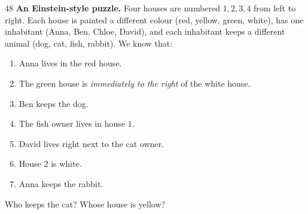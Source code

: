 \begin{probbox}{48}{}
\textbf{An Einstein-style puzzle.} Four houses are numbered $1, 2, 3, 4$ from left to right. Each house is painted a different colour
(red, yellow, green, white), has one inhabitant (Anna, Ben, Chloe, David), and each inhabitant keeps a different animal (dog, cat, fish,
rabbit). We know that:
\begin{enumerate}[label=(\arabic*),leftmargin=2em,itemsep=0pt,topsep=2pt]
  \item Anna lives in the red house.
  \item The green house is \emph{immediately to the right} of the white house.
  \item Ben keeps the dog.
  \item The fish owner lives in house $1$.
  \item David lives right next to the cat owner.
  \item House $2$ is white.
  \item Anna keeps the rabbit.
\end{enumerate}
Who keeps the cat? Whose house is yellow?
\end{probbox}
